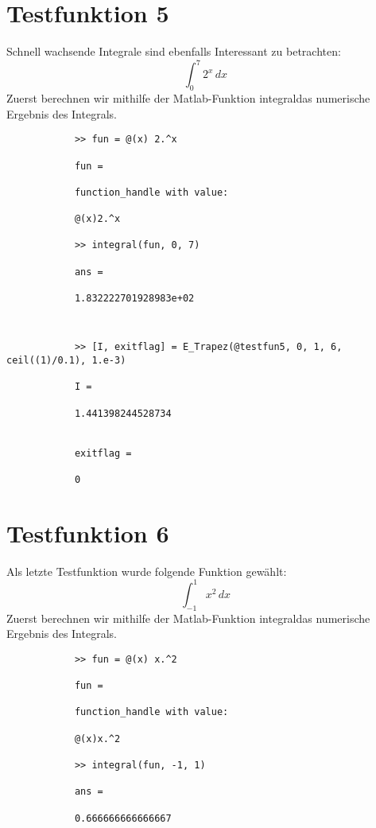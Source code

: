 \documentclass[11pt,titlepage]{article}
\begin{document}
	\section{Testfunktion 5}
		Schnell wachsende Integrale sind ebenfalls Interessant zu betrachten:
		\begin{displaymath}
			\int_{0}^7 2^x \, dx\
		\end{displaymath}
		Zuerst berechnen wir mithilfe der Matlab-Funktion \glqq integral\grqq  das numerische Ergebnis des Integrals.
		\begin{lstlisting}
			>> fun = @(x) 2.^x
			
			fun =
			
			function_handle with value:
			
			@(x)2.^x
			
			>> integral(fun, 0, 7)
			
			ans =
			
			1.832222701928983e+02
		\end{lstlisting}
		\begin{lstlisting}
			
		\end{lstlisting}
		\begin{lstlisting}
			>> [I, exitflag] = E_Trapez(@testfun5, 0, 1, 6, ceil((1)/0.1), 1.e-3)
			
			I =
			
			1.441398244528734
			
			
			exitflag =
			
			0
		\end{lstlisting}

	\section{Testfunktion 6}
		Als letzte Testfunktion wurde folgende Funktion gewählt:
		\begin{displaymath}
			\int_{-1}^1  x^2 \, dx\
		\end{displaymath}
		Zuerst berechnen wir mithilfe der Matlab-Funktion \glqq integral\grqq  das numerische Ergebnis des Integrals.
		\begin{lstlisting}
			>> fun = @(x) x.^2
			
			fun =
			
			function_handle with value:
			
			@(x)x.^2
			
			>> integral(fun, -1, 1)
			
			ans =
			
			0.666666666666667
		\end{lstlisting}
		\begin{lstlisting}
			
		\end{lstlisting}
			
\end{document}

